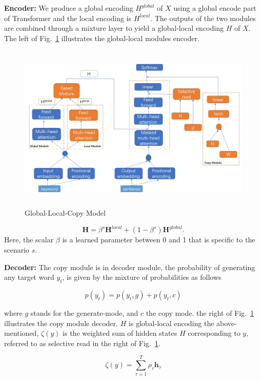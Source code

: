\documentclass[sigconf]{acmart}
\begin{document}
\textbf{Encoder:} We produce a global encoding $H^{global}$ of $X$ using a global encode part of Transformer and the local encoding is $H^{local}$. The outputs of the two modules are combined through a mixture layer to yield a global-local encoding $H$ of $X$. The left of Fig.~\ref{fig:model} illustrates the global-local modules encoder. 
\begin{figure}
    \centering
    \includegraphics[width=12cm,height=8cm]{model2.jpg}
\caption{Global-Local-Copy Model}\label{fig:model}
\end{figure}

\begin{equation}\label{equ:mixture}
    \mathbf{H} = \beta^s\mathbf{H}^{local} + (1-\beta^s)\mathbf{H}^{global}.
\end{equation}
Here, the scalar $\beta$ is a learned parameter between 0 and 1 that is specific to the scenario $s$.

\textbf{Decoder:} The copy module is in decoder module, the probability of generating any target word $y_t$, is given by the mixture of probabilities as follows

\begin{equation}\label{equ:mixture-prob}
    p(y_t) = p(y_t,g) + p(y_t,c)
\end{equation}

where $g$ stands for the generate-mode, and $c$ the
copy mode. the right of Fig.~\ref{fig:model} illustrates the copy module decoder. $H$ is global-local encoding the above-mentioned, $\zeta(y)$ is the weighted sum of hidden states $H$ corresponding to $y$, referred to as selective read in the right of Fig.~\ref{fig:model}. 

\begin{equation}\label{equ:zeta}
    \zeta(y) = \sum^{T}_{\tau = 1} \rho_\tau \textbf{h}_\tau 
\end{equation}
\end{document}
